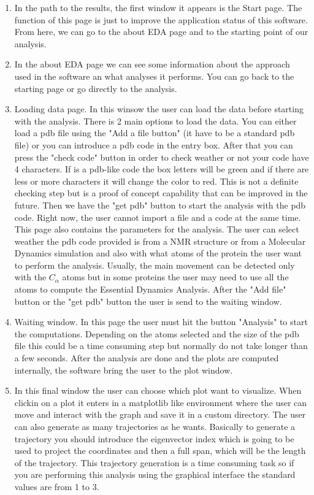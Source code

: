 \documentclass[12pt]{article}
\begin{document}
 \begin{enumerate}
 \item In the path to the results, the first window it appears is the Start page. The function of this page is just to improve the application status of this software. From here, we can go to the about EDA page and to the starting point of our analysis. 
 \item In the about EDA page we can see some information about the approach used in the software an what analyses it performs. You can go back to the starting page or go directly to the analysis.
 \item Loading data page. In this winsow the user can load the data before starting with the analysis. There is 2 main options to load the data. You can either load a pdb file using the "Add a file button" (it have to be a standard pdb file) or you can introduce a pdb code in the entry box. After that you can press the "check code" button in order to check weather or not your code have 4 characters. If is a pdb-like code the box letters will be green and if there are less or more characters it will change the color to red. This is not a definite checking step but is a proof of concept capability that can be improved in the future. Then we have the "get pdb" button to start the analysis with the pdb code. Right now, the user cannot import a file and a code at the same time. This page also contains the parameters for the analysis. The user can select weather the pdb code provided is from a NMR structure or from a Molecular Dynamics simulation and also with what atoms of the protein the user want to perform the analysis. Usually, the main movement can be detected only with the $C_{\alpha}$ atoms but in some proteins the user may need to use all the atoms to compute the Essential Dynamics Analysis. After the "Add file" button or the "get pdb" button the user is send to the waiting window.
 \item Waiting window. In this page the user must hit the button "Analysis" to start the computations. Depending on the atoms selected and the size of the pdb file this could be a time consuming step but normally do not take longer than a few seconds. After the analysis are done and the plots are computed internally, the software bring the user to the plot window. 
 \item In this final window the user can choose which plot want to visualize. When clickin on a plot it enters in a matplotlib like environment where the user can move and interact with the graph and save it in a custom directory. The user can also generate as many trajectories as he wants. Basically to generate a trajectory you should introduce the eigenvector index which is going to be used to project the coordinates and then a full span, which will be the length of the trajectory. This trajectory generation is a time consuming task so if you are performing this analysis using the graphical interface the standard values are from 1 to 3. 
 
 
 \end{enumerate}
 
\end{document}
